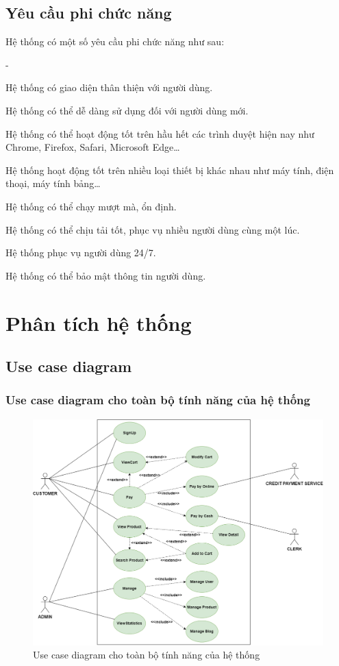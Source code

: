 \subsection{Yêu cầu phi chức năng}
Hệ thống có một số yêu cầu phi chức năng như sau:
\begin {list} {-}{}
    \item Hệ thống có giao diện thân thiện với người dùng.
    \item Hệ thống có thể dễ dàng sử dụng đối với người dùng mới.
    \item Hệ thống có thể hoạt động tốt trên hầu hết các trình duyệt hiện nay như Chrome, Firefox, Safari, Microsoft Edge\dots
    \item Hệ thống hoạt động tốt trên nhiều loại thiết bị khác nhau như máy tính, điện thoại, máy tính bảng\dots
    \item Hệ thống có thể chạy mượt mà, ổn định.
    \item Hệ thống có thể chịu tải tốt, phục vụ nhiều người dùng cùng một lúc.
    \item Hệ thống phục vụ người dùng 24/7.
    \item Hệ thống có thể bảo mật thông tin người dùng.
\newpage
\section{Phân tích hệ thống}
\subsection{Use case diagram}
\subsubsection{Use case diagram cho toàn bộ tính năng của hệ thống}
\begin{figure}[h]
    \centering
    \includegraphics[scale=0.4]{images/hieu/chap-3/usecase-diagram.png}
    \caption{Use case diagram cho toàn bộ tính năng của hệ thống}
\end{figure}
\newpage

\end{list}
